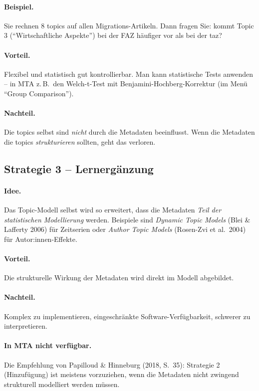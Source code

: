 \documentclass[a4paper,11pt]{article}
\begin{document}
\paragraph{Beispiel.} Sie rechnen 8 topics auf allen Migrations-Artikeln.
Dann fragen Sie: kommt Topic 3 (\enquote{Wirtschaftliche Aspekte}) bei
der FAZ häufiger vor als bei der taz?

\paragraph{Vorteil.} Flexibel und statistisch gut kontrollierbar. Man
kann statistische Tests anwenden -- in MTA z.\,B.\ den Welch-t-Test
mit Benjamini-Hochberg-Korrektur (im Menü \enquote{Group Comparison}).

\paragraph{Nachteil.} Die topics selbst sind \emph{nicht} durch die
Metadaten beeinflusst. Wenn die Metadaten die topics
\emph{strukturieren} sollten, geht das verloren.

\subsection{Strategie 3 -- Lernergänzung}

\paragraph{Idee.} Das Topic-Modell selbst wird so erweitert, dass die
Metadaten \emph{Teil der statistischen Modellierung} werden. Beispiele
sind \emph{Dynamic Topic Models} (Blei \& Lafferty 2006) für
Zeitserien oder \emph{Author Topic Models} (Rosen-Zvi et al.\ 2004)
für Autor:innen-Effekte.

\paragraph{Vorteil.} Die strukturelle Wirkung der Metadaten wird
direkt im Modell abgebildet.

\paragraph{Nachteil.} Komplex zu implementieren, eingeschränkte
Software-Verfügbarkeit, schwerer zu interpretieren.

\paragraph{In MTA nicht verfügbar.} Die Empfehlung von Papilloud \&
Hinneburg (2018, S.~35): Strategie 2 (Hinzufügung) ist meistens
vorzuziehen, wenn die Metadaten nicht zwingend strukturell modelliert
werden müssen.
\end{document}

